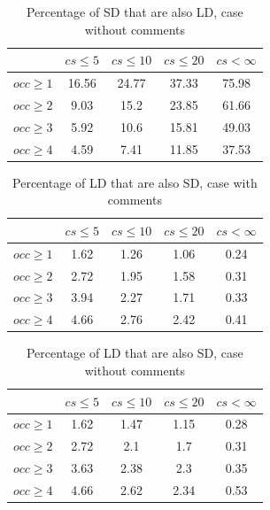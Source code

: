 \documentclass[a4paper,twoside]{article}
\begin{document}
\begin{table}[!h]
\renewcommand{\arraystretch}{1.25}
\caption{Percentage of SD that are also LD, case without comments}
\label{tab:percSD:nocomm}
\centering

\begin{tabular}{|c|c|c|c|c|}
\hline
	      &	$cs\leq 5$	&	$cs\leq 10$	&	$cs\leq 20$	&	$cs< \infty$	\\
\hline
$occ\geq 1$	&	16.56	&	24.77	&	37.33	&	75.98	\\
$occ\geq 2$	&	9.03	&	15.2	&	23.85	&	61.66	\\
$occ\geq 3$	&	5.92	&	10.6	&	15.81	&	49.03	\\
$occ\geq 4$	&	4.59	&	7.41	&	11.85	&	37.53	\\
\hline
\end{tabular}
\end{table}


\begin{table}[!h]
\renewcommand{\arraystretch}{1.25}
\caption{Percentage of LD that are also SD, case with comments}
\label{tab:percLD:comm}
\centering

\begin{tabular}{|c|c|c|c|c|}
\hline
	      &	$cs\leq 5$	&	$cs\leq 10$	&	$cs\leq 20$	&	$cs< \infty$	\\
\hline
$occ\geq 1$	&	1.62	&	1.26	&	1.06	&	0.24	\\
$occ\geq 2$	&	2.72	&	1.95	&	1.58	&	0.31	\\
$occ\geq 3$	&	3.94	&	2.27	&	1.71	&	0.33	\\
$occ\geq 4$	&	4.66	&	2.76	&	2.42	&	0.41	\\
\hline
\end{tabular}
\end{table}


\begin{table}[!h]
\renewcommand{\arraystretch}{1.25}
\caption{Percentage of LD that are also SD, case without comments}
\label{tab:percLD:nocomm}
\centering
\begin{tabular}{|c|c|c|c|c|}
\hline
	      &	$cs\leq 5$	&	$cs\leq 10$	&	$cs\leq 20$	&	$cs< \infty$	\\
\hline
$occ\geq 1$	&	1.62	&	1.47	&	1.15	&	0.28	\\
$occ\geq 2$	&	2.72	&	2.1	&	1.7	&	0.31	\\
$occ\geq 3$	&	3.63	&	2.38	&	2.3	&	0.35	\\
$occ\geq 4$	&	4.66	&	2.62	&	2.34	&	0.53	\\
\hline
\end{tabular}
\end{table}
\end{document}
